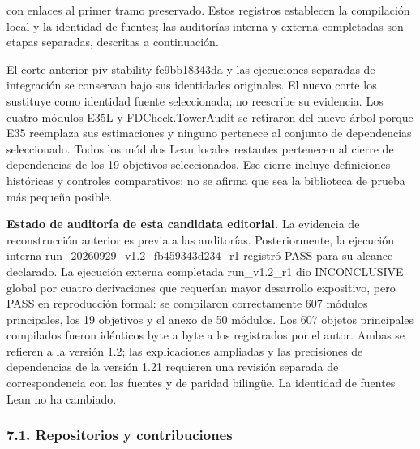 \documentclass[spanish,11pt,a4paper]{article}
\begin{document}
con enlaces al primer tramo preservado. Estos registros establecen la compilación local y la identidad de fuentes; las auditorías interna y externa completadas son etapas separadas, descritas a continuación.

El corte anterior {\ttfamily\small piv-\discretionary{\hbox{\ensuremath{\hookrightarrow}}}{}{}stability-\discretionary{\hbox{\ensuremath{\hookrightarrow}}}{}{}fe9bb18343da} y las ejecuciones separadas de integración se conservan bajo sus identidades originales. El nuevo corte los sustituye como identidad fuente seleccionada; no reescribe su evidencia. Los cuatro módulos E35L y {\ttfamily\small FDCheck.\discretionary{\hbox{\ensuremath{\hookrightarrow}}}{}{}TowerAudit} se retiraron del nuevo árbol porque E35 reemplaza sus estimaciones y ninguno pertenece al conjunto de dependencias seleccionado. Todos los módulos Lean locales restantes pertenecen al cierre de dependencias de los 19 objetivos seleccionados. Ese cierre incluye definiciones históricas y controles comparativos; no se afirma que sea la biblioteca de prueba más pequeña posible.

\textbf{Estado de auditoría de esta candidata editorial.} La evidencia de reconstrucción anterior es previa a las auditorías. Posteriormente, la ejecución interna {\ttfamily\small run\_\discretionary{\hbox{\ensuremath{\hookrightarrow}}}{}{}20260929\_\discretionary{\hbox{\ensuremath{\hookrightarrow}}}{}{}v1.\discretionary{\hbox{\ensuremath{\hookrightarrow}}}{}{}2\_\discretionary{\hbox{\ensuremath{\hookrightarrow}}}{}{}fb459343d234\discretionary{\hbox{\ensuremath{\hookrightarrow}}}{}{}\_\discretionary{\hbox{\ensuremath{\hookrightarrow}}}{}{}r1} registró PASS para su alcance declarado. La ejecución externa completada {\ttfamily\small run\_\discretionary{\hbox{\ensuremath{\hookrightarrow}}}{}{}v1.\discretionary{\hbox{\ensuremath{\hookrightarrow}}}{}{}2\_\discretionary{\hbox{\ensuremath{\hookrightarrow}}}{}{}r1} dio INCONCLUSIVE global por cuatro derivaciones que requerían mayor desarrollo expositivo, pero PASS en reproducción formal: se compilaron correctamente 607 módulos principales, los 19 objetivos y el anexo de 50 módulos. Los 607 objetos principales compilados fueron idénticos byte a byte a los registrados por el autor. Ambas se refieren a la versión 1.2; las explicaciones ampliadas y las precisiones de dependencias de la versión 1.21 requieren una revisión separada de correspondencia con las fuentes y de paridad bilingüe. La identidad de fuentes Lean no ha cambiado.

\subsubsection{7.1. Repositorios y contribuciones}\label{repositorios-y-contribuciones}
\end{document}
